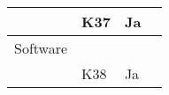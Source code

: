 \documentclass[class=article, crop=false]{standalone}
\begin{document}
\begin{table}[]
\begin{tabular}{|l|l|l|l|}
            & K37      & Ja                 &                                                                                                                                                                                                    \\ \hline
            Software        &          &                    &                                                                                                                                                                                                    \\ \hline
            & K38      & Ja                 &                                                                                                                                                                                                    \\ \hline
        \end{tabular}
    \end{table}
\end{document}
